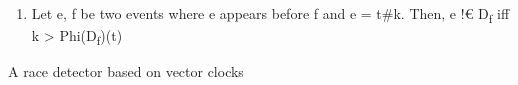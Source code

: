 \documentclass[landscape, a4paper]{article}
\begin{document}
\begin{minipage}[t]{0.195\linewidth}
\begin{betterlist}
\begin{betterlist}
\begin{enumerate}
\begin{betterlist}
				\end{betterlist}
				\item Let e, f be two events where e appears before f and e = t\#k. Then, e !€ D\textsubscript{f} iff k > Phi(D\textsubscript{f})(t)
			\end{enumerate}
		\end{betterlist}
		\item {} A race detector based on vector clocks
		\vspace{-0.25cm}


\end{betterlist}
\end{minipage}
\end{document}
